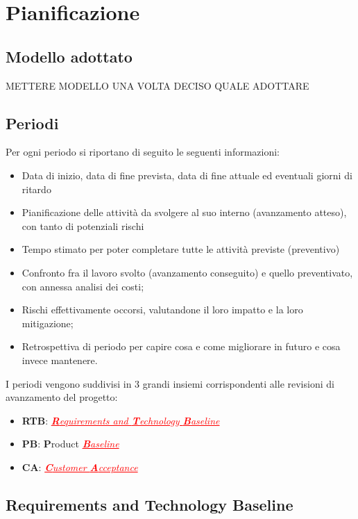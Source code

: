 
\section{Pianificazione}
\subsection{Modello adottato}

METTERE MODELLO UNA VOLTA DECISO QUALE ADOTTARE
\subsection{Periodi}

Per ogni periodo si riportano di seguito le seguenti informazioni:
\begin{itemize}
    \item Data di inizio, data di fine prevista, data di fine attuale ed eventuali giorni di ritardo
    \item Pianificazione delle attività da svolgere al suo interno (avanzamento atteso), con tanto di potenziali rischi
    \item Tempo stimato per poter completare tutte le attività previste (preventivo)
    \item Confronto fra il lavoro svolto (avanzamento conseguito) e quello preventivato, con annessa analisi dei costi;
    \item Rischi effettivamente occorsi, valutandone il loro impatto e la loro mitigazione;
    \item Retrospettiva di periodo per capire cosa e come migliorare in futuro e cosa invece mantenere.
\end{itemize}
I periodi vengono suddivisi in 3 grandi insiemi corrispondenti alle revisioni di avanzamento del progetto:
\begin{itemize}
    \item \textbf{RTB}: \textcolor{red}{\uline{\textit{\textbf{R}equirements and \textbf{T}echnology \textbf{B}aseline}}}
    \item \textbf{PB}:  \textbf{P}roduct \textcolor{red}{\uline{\textit{\textbf{B}aseline}}}
    \item \textbf{CA}:  \textcolor{red}{\uline{\textit{\textbf{C}ustomer \textbf{A}cceptance}}}
\end{itemize}

\subsection{Requirements and Technology Baseline}
